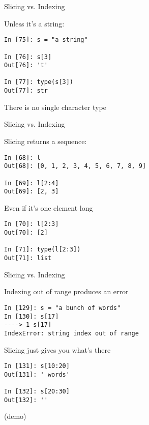\documentclass{beamer}
\begin{document}
\begin{frame}[fragile]{Slicing vs. Indexing}

{\Large Unless it's a string:}

\begin{verbatim}
In [75]: s = "a string"

In [76]: s[3]
Out[76]: 't'

In [77]: type(s[3])
Out[77]: str
\end{verbatim}

\vfill
There is no single character type

\end{frame}


\begin{frame}[fragile]{Slicing vs. Indexing}

{\Large Slicing returns a sequence:}

\begin{verbatim}
In [68]: l
Out[68]: [0, 1, 2, 3, 4, 5, 6, 7, 8, 9]

In [69]: l[2:4]
Out[69]: [2, 3]
\end{verbatim}

Even if it's one element long

\begin{verbatim}
In [70]: l[2:3]
Out[70]: [2]

In [71]: type(l[2:3])
Out[71]: list
\end{verbatim}

\end{frame}

\begin{frame}[fragile]{Slicing vs. Indexing}

{\Large Indexing out of range produces an error}
\vfill
\begin{verbatim}
In [129]: s = "a bunch of words"
In [130]: s[17]
----> 1 s[17]
IndexError: string index out of range
\end{verbatim}

\vfill
{\Large Slicing just gives you what's there}

\begin{verbatim}
In [131]: s[10:20]
Out[131]: ' words'

In [132]: s[20:30]
Out[132]: ''
\end{verbatim}
(demo)
\end{frame}
\end{document}
